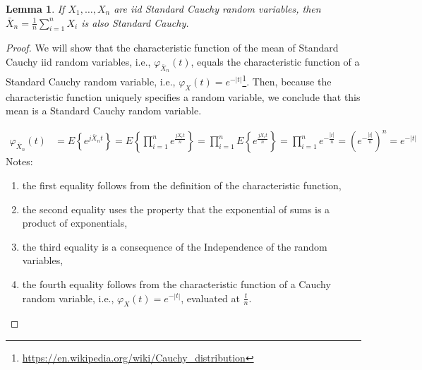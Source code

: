 \documentclass[12pt]{article}
\newtheorem{lemma}{Lemma}
\begin{document}
\begin{appendices}
\begin{figure}[H]
\begin{center}
        \label{fig:cltExamples}

    \end{center}

\end{figure}

\begin{lemma}
    If $X_1,\ldots,X_n$ are iid Standard Cauchy random variables, then
    $\bar{X}_n=\frac{1}{n}\sum_{i=1}^nX_i$ is also Standard Cauchy.
    \label{lemma:samleMeanOfStdCauchyIsStdCauchy}
\end{lemma}
\begin{proof}

    We will show that the characteristic function of the mean of Standard
    Cauchy iid random variables, i.e., $\varphi_{\bar{X}_n}(t)$, equals the
    characteristic function of a Standard Cauchy random variable, i.e.,
    $\varphi_X(t)=e^{-|t|}$\footnote{\url{https://en.wikipedia.org/wiki/Cauchy_distribution}}.
    Then, because the characteristic function uniquely specifies a random
    variable, we conclude that this mean is a Standard Cauchy random variable.

    \begin{align}
        \varphi_{\bar{X}_n}(t)&=E\left\{e^{j\bar{X}_nt}\right\}=E\left\{\prod_{i=1}^ne^{\frac{jX_it}{n}}\right\}=\prod_{i=1}^nE\left\{e^{\frac{jX_it}{n}}\right\}=\prod_{i=1}^ne^{-\frac{|t|}{n}}=\left(e^{-\frac{|t|}{n}}\right)^n=e^{-|t|}
    \end{align}
    Notes:
    \begin{enumerate}

        \item the first equality follows from the definition of the
            characteristic function,

        \item the second equality uses the property that the exponential of
            sums is a product of exponentials,

        \item the third equality is a consequence of the Independence of the
            random variables,

        \item the fourth equality follows from the characteristic function of a
            Cauchy random variable, i.e., $\varphi_X(t)=e^{-|t|}$, evaluated at
            $\frac{t}{n}$.
    \end{enumerate}

\end{proof}
\end{appendices}
\end{document}
